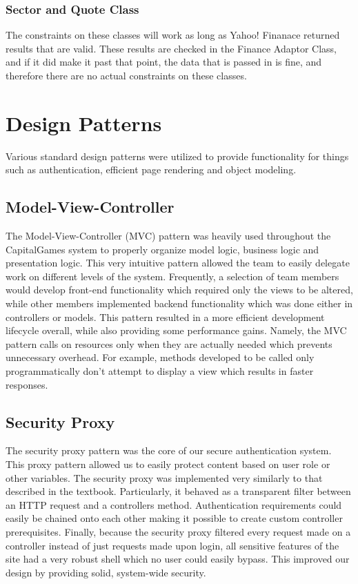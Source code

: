 \subsubsection{Sector and Quote Class}
The constraints on these classes will work as long as Yahoo! Finanace returned results that are valid. These results are checked in the Finance Adaptor Class, and if it did make it past that point, the data that is passed in is fine, and therefore there are no actual constraints on these classes.


\section{Design Patterns}
Various standard design patterns were utilized to provide functionality for things such as authentication, efficient page rendering and object modeling.
\subsection{Model-View-Controller}
The Model-View-Controller (MVC) pattern was heavily used throughout the CapitalGames system to properly organize model logic, business logic and presentation logic. This very intuitive pattern allowed the team to easily delegate work on different levels of the system. Frequently, a selection of team members would develop front-end functionality which required only the views to be altered, while other members implemented backend functionality which was done either in controllers or models. This pattern resulted in a more efficient development lifecycle overall, while also providing some performance gains. Namely, the MVC pattern calls on resources only when they are actually needed which prevents unnecessary overhead. For example, methods developed to be called only programmatically don't attempt to display a view which results in faster responses.
\subsection{Security Proxy}
The security proxy pattern was the core of our secure authentication system. This proxy pattern allowed us to easily protect content based on user role or other variables. The security proxy was implemented very similarly to that described in the textbook. Particularly, it behaved as a transparent filter between an HTTP request and a controllers method. Authentication requirements could easily be chained onto each other making it possible to create custom controller prerequisites. Finally, because the security proxy filtered every request made on a controller instead of just requests made upon login, all sensitive features of the site had a very robust shell which no user could easily bypass. This improved our design by providing solid, system-wide security.
